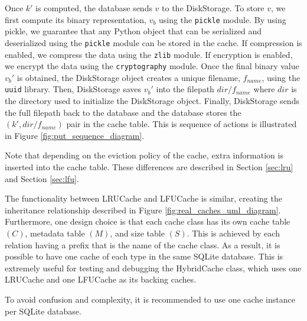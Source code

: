 \documentclass[11pt, journal]{IEEEtran}
\begin{document}
Once $k'$ is computed, the database sends $v$ to the DiskStorage.
To store $v$, we first
compute its binary representation, $v_b$ using the \texttt{pickle} module.
By using pickle, we guarantee that any Python object
that can be serialized and deserialized using
the \texttt{pickle} module can be stored in the cache.
If compression is enabled, we compress the data using the \texttt{zlib} module.
If encryption is enabled, we encrypt the data using the \texttt{cryptography}
module. Once the final binary value $v_b'$ is obtained,
the DiskStorage object creates a unique
filename, $f_{name}$, using the \texttt{uuid} library.
Then, DiskStorage saves $v_b'$ into the filepath $dir/f_{name}$ where $dir$ is the directory
used to initialize the DiskStorage object. Finally, DiskStorage sends the full filepath
back to the database and the database stores the $(k', dir/f_{name})$ pair in the cache table.
This is sequence of actions is illustrated in Figure \ref{fig:put_sequence_diagram}.

Note that depending on the eviction policy of the cache, extra information
is inserted into the cache table. These differences are described in
Section \ref{sec:lru} and Section \ref{sec:lfu}.

The functionality between LRUCache and LFUCache
is similar, creating the inheritance relationship described in Figure \ref{fig:real_caches_uml_diagram}.
Furthermore, one design choice is that each cache class has its own cache table $(C)$,
metadata table $(M)$, and size table $(S)$.
This is achieved by each relation having a prefix
that is the name of the cache class. As a result, it is possible to have
one cache of each type in the same SQLite database. This is extremely useful
for testing and debugging the HybridCache class,
which uses one LRUCache and one LFUCache
as its backing caches.

\begin{tcolorbox}[colback=blue!5!white, colframe=blue!75!black, title=Note]
    To avoid confusion and complexity, it is recommended to use
    one cache instance per SQLite database.
\end{tcolorbox}
\end{document}
